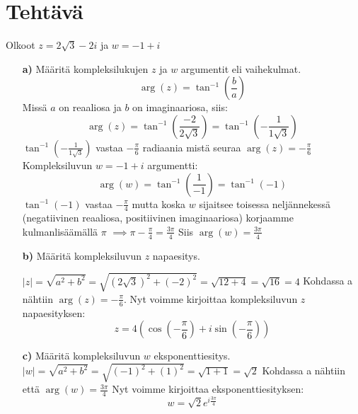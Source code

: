 \documentclass{article}
\newcounter{tehtava}
\begin{document}
\newpage
{}
\section*{Tehtävä \thetehtava}
Olkoot $z = 2\sqrt{3} - 2i$ ja $w = -1 + i$
\begin{itemize}
    \item[\textbf{a)}] Määritä kompleksilukujen $z$ ja $w$ argumentit eli vaihekulmat.
    \[
        \arg(z) = \tan^{-1}\left(\frac{b}{a}\right)
    \]
    Missä $a$ on reaaliosa ja $b$ on imaginaariosa, siis:
    \[
        \arg(z) = \tan^{-1}\left(\frac{-2}{2\sqrt{3}}\right) = \tan^{-1}\left(-\frac{1}{1\sqrt{3}}\right)
    \]
    $\tan^{-1}\left(-\frac{1}{1\sqrt{3}}\right)$ vastaa $-\frac{\pi}{6}$ radiaania mistä seuraa $\arg(z) = -\frac{\pi}{6}$\newline
    \newline
    Kompleksiluvun $w = -1 + i$ argumentti:\newline
    \[
        \arg(w) = \tan^{-1}\left(\frac{1}{-1}\right) = \tan^{-1}\left(-1\right)
    \]
    $\tan^{-1}\left(-1\right)$ vastaa $-\frac{\pi}{4}$ mutta koska $w$ sijaitsee toisessa neljännekessä (negatiivinen reaaliosa, positiivinen imaginaariosa) korjaamme kulman\linebreak lisäämällä $\pi$\newline
    $\implies \pi - \frac{\pi}{4} = \frac{3\pi}{4}$\newline
    Siis $\arg(w) = \frac{3\pi}{4}$
    

    \item[\textbf{b)}] Määritä kompleksiluvun $z$ napaesitys.\newline
    
    $|z| = \sqrt{a^2 + b^2} = \sqrt{(2\sqrt{3})^2 + (-2)^2} = \sqrt{12 + 4} = \sqrt{16} = 4$ \newline
    Kohdassa a nähtiin $\arg(z) = -\frac{\pi}{6}$.\newline
    Nyt voimme kirjoittaa kompleksiluvun $z$ napaesityksen:
    \[
        z = 4 \left( \cos \left( -\frac{\pi}{6} \right) + i \sin \left( -\frac{\pi}{6} \right) \right)
    \]
    \item[\textbf{c)}] Määritä kompleksiluvun $w$ eksponenttiesitys.\newline
    $|w| = \sqrt{a^2 + b^2} = \sqrt{(-1)^2 + (1)^2} = \sqrt{1 + 1} = \sqrt{2}$\newline
    Kohdassa a nähtiin että $\arg(w) = \frac{3\pi}{4}$\newline
    Nyt voimme kirjoittaa eksponenttiesityksen:
    \[
        w = \sqrt{2} e^{i \frac{3\pi}{4}}
    \]
    

\end{itemize}
\end{document}
